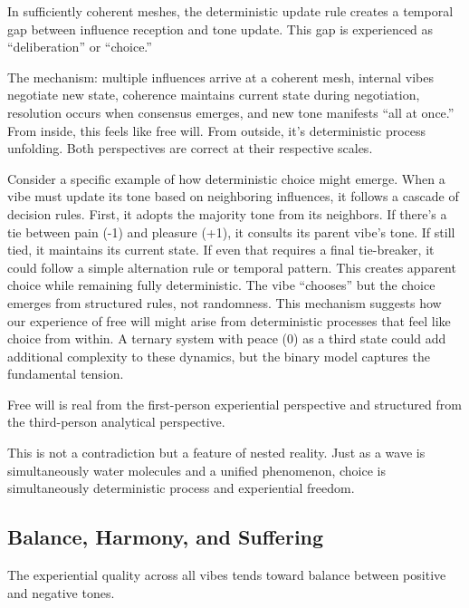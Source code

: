 \begin{theorem}
In sufficiently coherent meshes, the deterministic update rule creates a temporal gap between influence reception and tone update. This gap is experienced as ``deliberation'' or ``choice.''
\end{theorem}

The mechanism: multiple influences arrive at a coherent mesh, internal vibes negotiate new state, coherence maintains current state during negotiation, resolution occurs when consensus emerges, and new tone manifests ``all at once.'' From inside, this feels like free will. From outside, it's deterministic process unfolding. Both perspectives are correct at their respective scales.

Consider a specific example of how deterministic choice might emerge. When a vibe must update its tone based on neighboring influences, it follows a cascade of decision rules. First, it adopts the majority tone from its neighbors. If there's a tie between pain (-1) and pleasure (+1), it consults its parent vibe's tone. If still tied, it maintains its current state. If even that requires a final tie-breaker, it could follow a simple alternation rule or temporal pattern. This creates apparent choice while remaining fully deterministic. The vibe ``chooses'' but the choice emerges from structured rules, not randomness. This mechanism suggests how our experience of free will might arise from deterministic processes that feel like choice from within. A ternary system with peace (0) as a third state could add additional complexity to these dynamics, but the binary model captures the fundamental tension.

\begin{axiom}
Free will is real from the first-person experiential perspective and structured from the third-person analytical perspective.
\end{axiom}

This is not a contradiction but a feature of nested reality. Just as a wave is simultaneously water molecules and a unified phenomenon, choice is simultaneously deterministic process and experiential freedom.

\subsection{Balance, Harmony, and Suffering}

\begin{axiom}
The experiential quality across all vibes tends toward balance between positive and negative tones.
\end{axiom}

